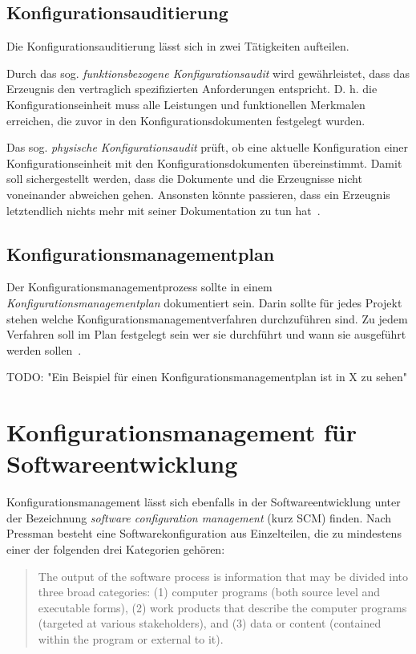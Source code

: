 \documentclass[runningheads,a4paper]{uwsese}
\begin{document}
\subsection{Konfigurationsauditierung}
Die Konfigurationsauditierung lässt sich in zwei Tätigkeiten aufteilen.

Durch das sog. {\em funktionsbezogene Konfigurationsaudit} wird gewährleistet,
dass das Erzeugnis den vertraglich spezifizierten Anforderungen entspricht.
D. h. die Konfigurationseinheit muss alle Leistungen und funktionellen Merkmalen
erreichen, die zuvor in den Konfigurationsdokumenten festgelegt wurden.

Das sog. {\em physische Konfigurationsaudit} prüft, ob eine aktuelle
Konfiguration einer Konfigurationseinheit mit den Konfigurationsdokumenten
übereinstimmt. Damit soll sichergestellt werden, dass die Dokumente und die
Erzeugnisse nicht voneinander abweichen gehen. Ansonsten könnte passieren, dass
ein Erzeugnis letztendlich nichts mehr mit seiner Dokumentation zu tun
hat~\cite[S. 7]{weischedel2002}.

\subsection{Konfigurationsmanagementplan}
Der Konfigurationsmanagementprozess sollte in einem
{\em Konfigurationsmanagementplan} dokumentiert sein. Darin sollte für jedes
Projekt stehen welche Konfigurationsmanagementverfahren durchzuführen sind. Zu
jedem Verfahren soll im Plan festgelegt sein wer sie durchführt und wann sie
ausgeführt werden sollen~\cite[S. 7f]{weischedel2002}.

TODO: "Ein Beispiel für einen Konfigurationsmanagementplan ist in X zu sehen"

\section{Konfigurationsmanagement für Softwareentwicklung}

Konfigurationsmanagement lässt sich ebenfalls in der Softwareentwicklung
unter der Bezeichnung {\em software configuration management} (kurz SCM)
finden. Nach Pressman \cite[p. 585f]{Pressman:2009:SEP:1593949} besteht eine
Softwarekonfiguration aus Einzelteilen, die zu mindestens einer der folgenden
drei Kategorien gehören:

\begin{quote}
  The output of the software process is information that may be divided into three
  broad categories: (1) computer programs (both source level and executable forms),
  (2) work products that describe the computer programs (targeted at various
  stakeholders), and (3) data or content (contained within the program or external
  to it).
\end{quote}
\end{document}
